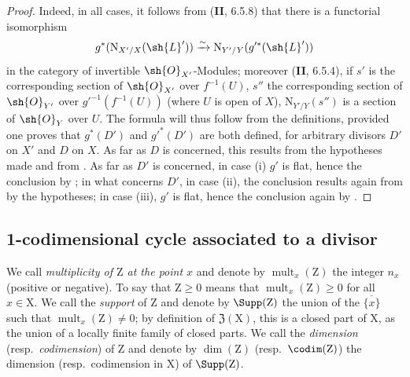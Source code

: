 \begin{proof}
Indeed, in all cases, it follows from (\textbf{II}, 6.5.8) that there is a functorial isomorphism
\[
  g^*(\mathrm{N}_{X'/X}(\sh{L}'))\xrightarrow{\sim}\mathrm{N}_{Y'/Y}(g'^*(\sh{L}'))
\]
in the category of invertible $\sh{O}_{X'}$-Modules;
moreover (\textbf{II}, 6.5.4), if $s'$ is the corresponding section of $\sh{O}_{X'}$ over $f^{-1}(U)$, $s''$ the corresponding section of $\sh{O}_{Y'}$ over $g'^{-1}(f^{-1}(U))$ (where $U$ is open of $X$), $\mathrm{N}_{Y'/Y}(s'')$ is a section of $\sh{O}_Y$ over $U$.
The formula  will thus follow from the definitions, provided one proves that $g^*(D')$ and $g'^*(D')$ are both defined, for arbitrary divisors $D'$ on $X'$ and $D$ on $X$.
As far as $D$ is concerned, this results from the hypotheses made and from .
As far as $D'$ is concerned, in case (i) $g'$ is flat, hence the conclusion by ;
in what concerns $D'$, in case (ii), the conclusion results again from  by the hypotheses;
in case (iii), $g'$ is flat, hence the conclusion again by .
\end{proof}
\subsection{1-codimensional cycle associated to a divisor}
\label{subsection:IV.21.6}


\begin{env}[21.6.1]
\label{IV.21.6.1}
We call \emph{multiplicity of $\mathrm{Z}$ at the point $x$} and denote by $\operatorname{mult}_x(\mathrm{Z})$ the integer $n_x$ (positive or negative).
To say that $\mathrm{Z}\geq 0$ means that $\operatorname{mult}_x(\mathrm{Z})\geq 0$ for all $x\in\mathrm{X}$.
We call the \emph{support} of $\mathrm{Z}$ and denote by $\Supp(\mathrm{Z})$ the union of the $\overline{\{x\}}$ such that $\operatorname{mult}_x(\mathrm{Z})\neq 0$;
by definition of $\mathfrak{Z}(\mathrm{X})$, this is a closed part of $\mathrm{X}$, as the union of a locally finite family of closed parts.
We call the \emph{dimension} (resp.\ \emph{codimension}) of $\mathrm{Z}$ and denote by $\dim(\mathrm{Z})$ (resp.\ $\codim(\mathrm{Z})$) the dimension (resp.\ codimension in $\mathrm{X}$) of $\Supp(\mathrm{Z})$.
\end{env}

